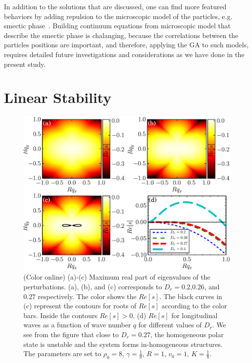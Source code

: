\documentclass[reprint,floatfix,amsmath,amssymb,aps,pre,showkeys,showpacs,superscriptaddress]{revtex4-1}
\newcommand{\hl}[1]{\textcolor{hlcolor}{#1}}
\begin{document}
\hl{In addition to the solutions that are discussed, one can find more featured behaviors by adding repulsion to the microscopic model of the particles, e.g. smectic phase~\cite{Menzel2013unidirectional,Romanczuk2016emergent,Menzel2016on,Chen2013universality,Adhyapak2013live}. Building continuum equations from microscopic model that describe the smectic phase is chalanging, because the correlations between the particles positions are important, and therefore, applying the GA to such models, requires detailed future investigations and considerations as we have done in the present study.}

\section{Linear Stability}
\label{section:linear-stability}

\begin{figure}
	\centering
	\includegraphics[width=\columnwidth]{Fig7_linear-stability}
\caption{(Color online) (a)-(c) Maximum real part of eigenvalues of the perturbations. (a), (b), and (c) corresponds to $D_r=0.2$,$0.26$, and $0.27$ respectively. The color shows the $Re[s]$. The black curves in (c) represent the contours for roots of $Re[s]$ according to the color bars. Inside the contours $Re[s] > 0$. (d) $Re[s]$ for longitudinal waves as a function of wave number $q$ for different values of $D_r$. We see from the figure that close to $D_r=0.27$, the homogeneous polar state is unstable and the system forms in-homogeneous structures. The parameters are set to $\rho_0=8$, $\gamma=\tfrac{1}{8}$, $R=1$, $v_0=1$, $K=\tfrac{1}{8}$.}
\label{fig:s-map}
\end{figure}
\end{document}
